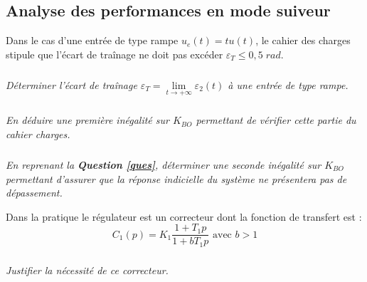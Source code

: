 \documentclass[11pt,oneside]{article}
\begin{document}
\subsection{Analyse des performances en mode suiveur}
Dans le cas d’une entrée de type rampe $u_e(t) = t u(t)$, le cahier des charges stipule que l’écart de
traînage ne doit pas excéder $\varepsilon_T \leq 0,5\;rad$.

\subparagraph{}
\textit{Déterminer l’écart de traînage $\varepsilon_T =\lim\limits_{t\to +\infty} \varepsilon_2(t)$ à une entrée de type rampe.}

\subparagraph{}
\textit{En déduire une première inégalité sur $K_{BO}$ permettant de vérifier cette partie du cahier
charges.}

\subparagraph{}
\textit{En reprenant la \textbf{Question \ref{ques}}, déterminer une seconde inégalité sur $K_{BO}$ permettant d’assurer que la réponse indicielle du système ne présentera pas de dépassement.}

Dans la pratique le régulateur est un correcteur dont la fonction de transfert est :
$$
C_1(p)=K_1\dfrac{1+T_1 p}{1+bT_1 p} \text{ avec } b>1
$$


\subparagraph{}
\textit{Justifier la nécessité de ce correcteur.}
\end{document}
